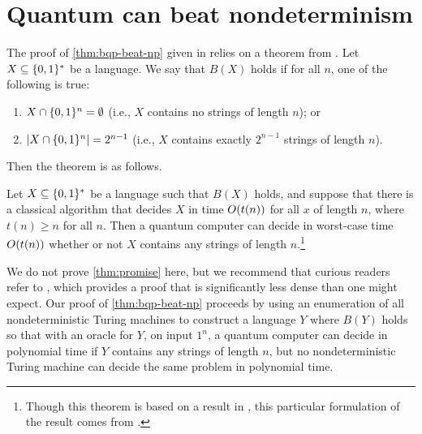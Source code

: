\documentclass[12pt]{article}
\begin{document}
\section{Quantum can beat nondeterminism \cite{BB92a}}

The proof of \cref{thm:bqp-beat-np} given in \cite{BB92a} relies on a theorem
from \cite{DJ92}. Let $X \subseteq \zo^*$ be a language. We say that $B(X)$
holds if for all $n$, one of the following is true:
\begin{enumerate}[label=(\arabic*)]
  \item $X \cap \zo^n = \emptyset$ (i.e., $X$ contains no strings of length
    $n$); or
  \item $\abs*{X \cap \zo^n} = 2^{n-1}$ (i.e., $X$ contains exactly $2^{n-1}$
    strings of length $n$).
\end{enumerate}
Then the theorem is as follows.

\begin{thm}[\cite{DJ92}]
  \label{thm:promise}
  Let $X \subseteq \zo^*$ be a language such that $B(X)$ holds, and suppose that
  there is a classical algorithm that decides $X$ in time $\bigo{t(n)}$ for all
  $x$ of length $n$, where $t(n) \ge n$ for all $n$. Then a quantum computer can
  decide in worst-case time $\bigo{t(n)}$ whether or not $X$ contains any
  strings of length $n$.\footnote{Though this theorem is based on a result in
  \cite{DJ92}, this particular formulation of the result comes from
  \cite{BB92b}.}
\end{thm}

We do not prove \cref{thm:promise} here, but we recommend that curious readers
refer to \cite{DJ92}, which provides a proof that is significantly less dense
than one might expect. Our proof of \cref{thm:bqp-beat-np} proceeds by using an
enumeration of all nondeterministic Turing machines to construct a language $Y$
where $B(Y)$ holds so that with an oracle for $Y$, on input $1^n$, a quantum
computer can decide in polynomial time if $Y$ contains any strings of length
$n$, but no nondeterministic Turing machine can decide the same problem in
polynomial time.
\end{document}
